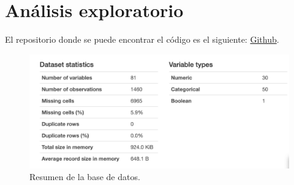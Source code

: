





\section{Análisis exploratorio}

El repositorio donde se puede encontrar el código es el siguiente: \textcolor{blue}{\href{https://github.com/RudiksChess/UVG-DataScience-Notas-6-Semestre/blob/main/Lab1/Code/Lab1.ipynb}{Github}}.

\begin{figure}[H]
	\centering 
	\includegraphics[scale=0.25]{Images/1}
	\caption{Resumen de la base de datos.}
	\label{fig:1}
\end{figure}

